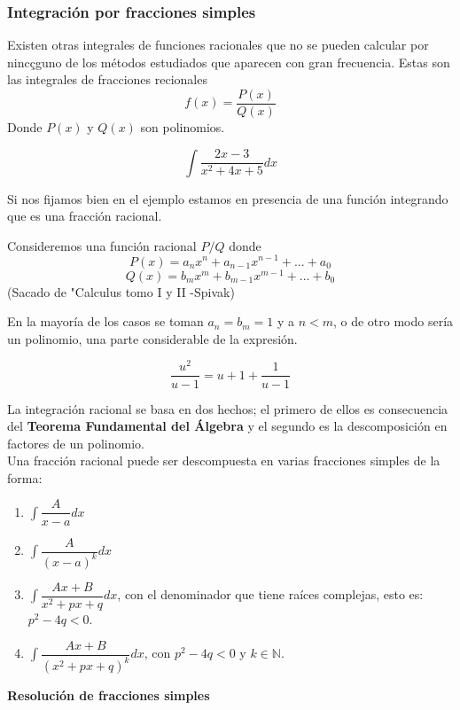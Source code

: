 \documentclass[10pt,twoside]{SelfArx} %
\begin{document}
\subsubsection{Integración por fracciones simples}
 Existen otras integrales de funciones racionales que no se pueden calcular por nincçguno de los métodos estudiados que aparecen con gran frecuencia. Estas son las integrales de fracciones recionales
 \[ f(x)=\dfrac{P(x)}{Q(x)} \]
 Donde $ P(x) $ y $ Q(x) $ son polinomios.
 \begin{ejemplo}
 	\[ \int\dfrac{2x-3}{x^{2}+4x+5}dx \]
 \end{ejemplo}
 Si nos fijamos bien en el ejemplo estamos en presencia de una función integrando que es una fracción racional.
 \begin{thm}
 	Consideremos una función racional $ P/Q $ donde
 	\[ P(x)=a_{n}x^{n}+a_{n-1}x^{n-1}+...+a_{0} \]
 	\[ Q(x)=b_{m}x^{m}+b_{m-1}x^{m-1}+...+b_{0} \]
 	(Sacado de "Calculus tomo I y II -Spivak)
 \end{thm}
 En la mayoría de los casos se toman $ a_{n}=b_{m}=1 $ y  a $ n<m $, o de otro modo ser\'ia un polinomio, una parte considerable de la expresi\'on.
 \begin{ejemplo}
 	\[ \dfrac{u^{2}}{u-1}=u+1+\dfrac{1}{u-1} \]
 \end{ejemplo}
 La integración racional se basa en dos hechos; el primero de ellos es consecuencia del \textbf{Teorema Fundamental del Álgebra}
 y el segundo es la descomposición en factores de un polinomio.
 \\
 Una fracción racional puede ser descompuesta en varias fracciones simples de la forma:
 \begin{enumerate}
 	\item $  \displaystyle\int \dfrac{A}{x-a}dx  $
 	\item  $ \displaystyle\int \dfrac{A}{(x-a)^{k}}dx  $
 	\item  $ \displaystyle\int\dfrac{Ax+B}{x^{2}+px+q}dx  $, con el denominador que tiene raíces complejas, esto es: $ p^{2}-4q<0 $.
 	\item  $ \displaystyle\int\dfrac{Ax+B}{(x^{2}+px+q)^{k}}dx  $, con $ p^{2}-4q<0 $ y $ k\in\mathbb{N} $.
 \end{enumerate}
 \textbf{Resolución de fracciones simples}\\
\end{document}
